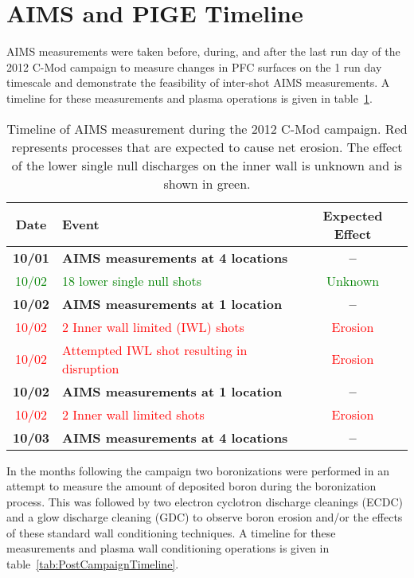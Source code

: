 \documentclass[11pt,a4paper,twocolumn]{article}
\begin{document}
\section{AIMS and PIGE Timeline}
\label{sec:AIMSPIGETimeline}
AIMS measurements were taken before, during, and after the last run day of the 2012 C-Mod campaign to measure changes in PFC surfaces on the 1 run day timescale and demonstrate the feasibility of inter-shot AIMS measurements.  A timeline for these measurements and plasma operations is given in table~\ref{tab:CampaignTimeline}.
%
\begin{table}
 \centering
 \begin{tabular}{|c|l|c|}
  \hline
  Date & Event & Expected Effect\\ \hline \hline
  \textbf{10/01} & \textbf{AIMS measurements at 4 locations} & \textbf{--}\\ \hline
  \textcolor{green}{10/02} & \textcolor{green}{18 lower single null shots} & \textcolor{green}{Unknown} \\ \hline
  \textbf{10/02} & \textbf{AIMS measurements at 1 location} & \textbf{--}\\ \hline
  \textcolor{red}{10/02} & \textcolor{red}{2 Inner wall limited (IWL) shots} & \textcolor{red}{Erosion} \\ \hline
  \textcolor{red}{10/02} & \textcolor{red}{Attempted IWL shot resulting in disruption} & \textcolor{red}{Erosion}\\ \hline
  \textbf{10/02} & \textbf{AIMS measurements at 1 location} & \textbf{--}\\ \hline
  \textcolor{red}{10/02} & \textcolor{red}{2 Inner wall limited shots} & \textcolor{red}{Erosion} \\ \hline
  \textbf{10/03} & \textbf{AIMS measurements at 4 locations} & \textbf{--}\\ \hline
 \end{tabular}
 \caption{Timeline of AIMS measurement during the 2012 C-Mod campaign.  Red represents processes that are expected to cause net erosion.  The effect of the lower single null discharges on the inner wall is unknown and is shown in green.}  
 \label{tab:CampaignTimeline}
\end{table}
%
In the months following the campaign two boronizations were performed in an attempt to measure the amount of deposited boron during the boronization process.  This was followed by two electron cyclotron discharge cleanings (ECDC) and a glow discharge cleaning (GDC) to observe boron erosion and/or the effects of these standard wall conditioning techniques.   A timeline for these measurements and plasma wall conditioning operations is given in table~\ref{tab:PostCampaignTimeline}. 
\end{document}
